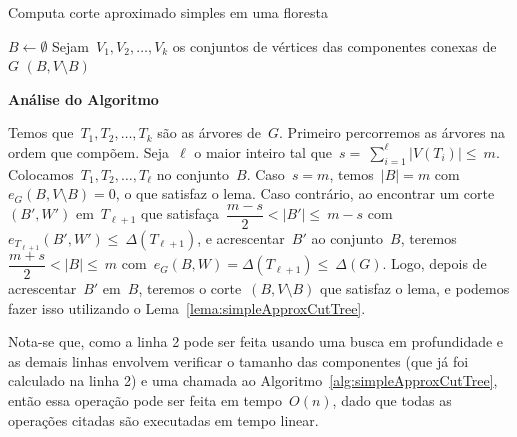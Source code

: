 \documentclass[a4paper,12pt]{article}
\begin{document}
\begin{algorithm}[H]
\label{alg:simpleApproxCutForest}

	\caption{Computa corte aproximado simples em uma floresta}
	$B \gets \emptyset$\;
	Sejam~$V_1, V_2,\ldots, V_k$ os conjuntos de vértices das
	componentes conexas de~$G$\;
	\Return $(B,V\setminus B)$\;

\end{algorithm}	

\bigskip
\bigskip
\bigskip

\textbf{Análise do Algoritmo}

	Temos que~$T_1, T_2, \ldots,T_k$ são 
	as árvores de~$G$. 
	Primeiro percorremos as árvores na ordem que compõem. 
	Seja~$\ell$ o maior inteiro tal 
	que~$s=~\displaystyle\sum_{i=1}^{\ell}|V(T_i)| \le~m$.
	Colocamos~$T_1,T_2, \ldots,T_\ell$ no conjunto~$B$.
	Caso~$s=m$, temos~$|B|=m$ com~$e_G(B,V\setminus B)=0$, o que 
	satisfaz o lema.
	Caso contrário, ao encontrar um corte~$(B',W')$ em~$T_{\ell+1}$
	que satisfaça~$\dfrac{m-s}{2}<|B'|\le~m-s$ 
	com~$e_{T_{\ell+1}}(B',W') \le~\Delta(T_{\ell+1})$, e 
	acrescentar~$B'$ ao conjunto~$B$, 
	teremos~$\dfrac{m+s}{2}<|B| \le~m$ 
	com~$e_G(B,W)=\Delta(T_{\ell+1}) \le~\Delta(G)$.
	Logo, depois de acrescentar~$B'$ em~$B$, teremos o 
	corte~$(B,V\setminus B)$ que satisfaz o lema, e podemos fazer 
	isso utilizando o Lema~\ref{lema:simpleApproxCutTree}.
	
	Nota-se que, como a linha 2 pode ser feita usando uma busca em 
	profundidade e as demais linhas envolvem verificar o tamanho 
	das componentes (que já foi calculado na linha 2) e uma 
	chamada ao Algoritmo~\ref{alg:simpleApproxCutTree}, então essa 
	operação pode ser feita em tempo~$O(n)$, dado que todas as 
	operações citadas são executadas em tempo linear. 

\bigskip
\bigskip
\bigskip


\end{document}
